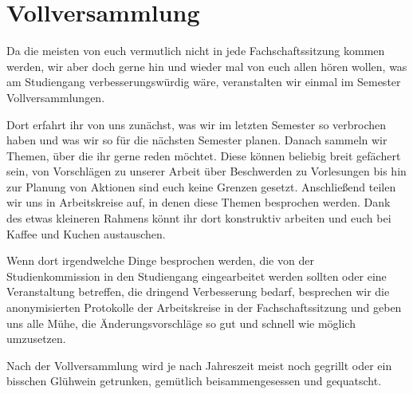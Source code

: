\section{Vollversammlung}
Da die meisten von euch vermutlich nicht in jede Fachschaftssitzung kommen werden, wir aber doch gerne hin und wieder mal von euch allen hören wollen, was am Studiengang verbesserungswürdig wäre, veranstalten wir einmal im Semester Vollversammlungen.

Dort erfahrt ihr von uns zunächst, was wir im letzten Semester so verbrochen haben und was wir so für die nächsten Semester planen. Danach sammeln wir Themen, über die ihr gerne reden möchtet. Diese können beliebig breit gefächert sein, von Vorschlägen zu unserer Arbeit über Beschwerden zu Vorlesungen bis hin zur Planung von Aktionen sind euch keine Grenzen gesetzt. Anschließend teilen wir uns in Arbeitskreise auf, in denen diese Themen besprochen werden. Dank des etwas kleineren Rahmens könnt ihr dort konstruktiv arbeiten und euch bei Kaffee und Kuchen austauschen.

Wenn dort irgendwelche Dinge besprochen werden, die von der Studienkommission in den Studiengang eingearbeitet werden sollten oder eine Veranstaltung betreffen, die dringend Verbesserung bedarf, besprechen wir die anonymisierten Protokolle der Arbeitskreise in der Fachschaftssitzung und geben uns alle Mühe, die Änderungsvorschläge so gut und schnell wie möglich umzusetzen.

Nach der Vollversammlung wird je nach Jahreszeit meist noch gegrillt oder ein bisschen Glühwein getrunken, gemütlich beisammengesessen und gequatscht.
